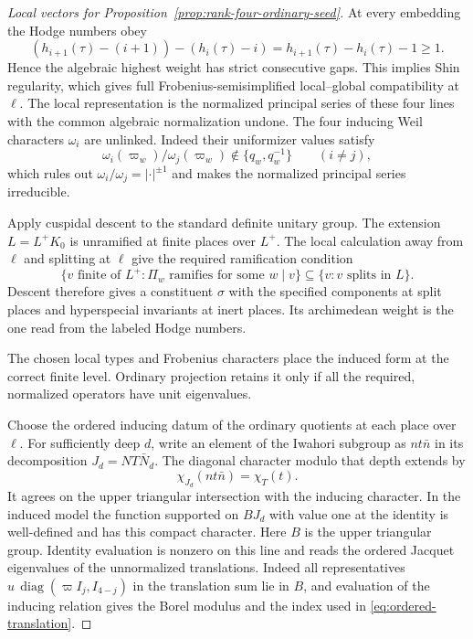 \begin{proof}[Local vectors for Proposition~\ref{prop:rank-four-ordinary-seed}]
At every embedding the Hodge numbers obey
\[
 (h_{i+1}(\tau)-(i+1))-(h_i(\tau)-i)
             =h_{i+1}(\tau)-h_i(\tau)-1\ge1 .
\]
Hence the algebraic highest weight has strict consecutive gaps.
This implies Shin regularity, which gives full Frobenius-semisimplified
local--global compatibility at \(\ell\). \cite[Theorem 1.1]{blggt-lg}
The local representation is the normalized principal series
of these four lines with the common algebraic normalization
undone. The four inducing Weil characters \(\omega_i\) are unlinked. Indeed their uniformizer values satisfy
\[
 \omega_i(\varpi_w)/\omega_j(\varpi_w)\notin\{q_w,q_w^{-1}\}\qquad(i\ne j),
\]
which rules out \(\omega_i/\omega_j=|\cdot|^{\pm1}\) and makes the normalized principal series irreducible.

Apply cuspidal descent to the standard definite unitary group.
The extension \(L=L^+K_0\) is unramified at finite places over
\(L^+\). The local calculation away from \(\ell\) and splitting
at \(\ell\) give the required ramification condition
\[
 \{v\text{ finite of }L^+: \Pi_w\text{ ramifies for some }w\mid v\}
       \subseteq \{v:v\text{ splits in }L\}.
\]
Descent therefore gives a constituent \(\sigma\) with the specified
components at split places and hyperspecial invariants at inert places.
Its archimedean weight is the one read from the labeled Hodge numbers.
\cite[Theorem 4.4]{thorne-unitary-descent}

The chosen local types and Frobenius characters place the induced form at the correct finite level. Ordinary projection retains it only if all the required, normalized operators have unit eigenvalues.

Choose the ordered inducing datum of the ordinary quotients
at each place over \(\ell\). For sufficiently deep \(d\), write an element of the Iwahori subgroup as \(nt\bar n\) in its decomposition \(J_d=NT\bar N_d\). The diagonal character modulo that depth extends by
\[
 \chi_{J_d}(nt\bar n)=\chi_T(t) .
\] It agrees on the upper triangular
intersection with the inducing character. In the induced
model the function supported on \(B J_d\) with value one at
the identity is well-defined and has this compact character.
Here \(B\) is the upper triangular group. Identity evaluation is nonzero on this line and reads the ordered Jacquet eigenvalues of the unnormalized translations. Indeed all representatives
\(u\,\operatorname{diag}(\varpi I_j,I_{4-j})\) in the translation
sum lie in \(B\), and evaluation of the inducing relation
gives the Borel modulus and the index used in
\eqref{eq:ordered-translation}.


\end{proof}

